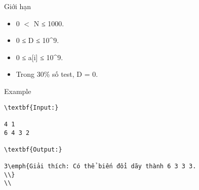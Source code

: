 Giới hạn  
\begin{itemize}
	\item     0 $<$ N ≤ 1000.   
	\item     0 ≤ D ≤ 10^9.   
	\item     0 ≤ a[i] ≤ 10^9.   
	\item     Trong 30\% số test, D = 0.   
\end{itemize}
   Example  
\begin{verbatim}
\textbf{Input:}

4 1
6 4 3 2

\textbf{Output:}

3\emph{Giải thích: Có thể biến đổi dãy thành 6 3 3 3.
\\}
\\\end{verbatim}